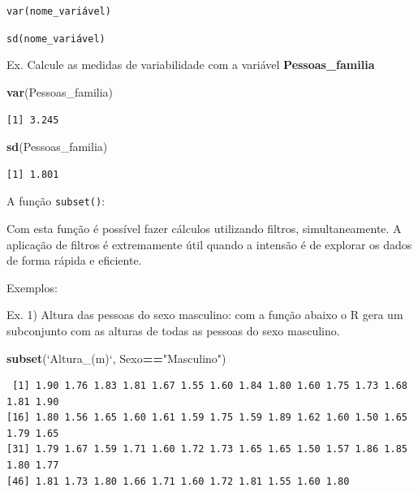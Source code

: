 \documentclass[12pt,brazil,oneside]{book}
\newenvironment{Shaded}{\begin{snugshade}}{\end{snugshade}}
\newcommand{\DataTypeTok}[1]{\textcolor[rgb]{0.13,0.29,0.53}{#1}}
\newcommand{\KeywordTok}[1]{\textcolor[rgb]{0.13,0.29,0.53}{\textbf{#1}}}
\newcommand{\NormalTok}[1]{#1}
\newcommand{\OperatorTok}[1]{\textcolor[rgb]{0.81,0.36,0.00}{\textbf{#1}}}
\newcommand{\StringTok}[1]{\textcolor[rgb]{0.31,0.60,0.02}{#1}}
\begin{document}
\texttt{var(nome\_variável)}

\texttt{sd(nome\_variável)}

Ex. Calcule as medidas de variabilidade com a variável \textbf{Pessoas\_familia}

\begin{Shaded}
\begin{Highlighting}[]
\KeywordTok{var}\NormalTok{(Pessoas_familia)}
\end{Highlighting}
\end{Shaded}

\begin{verbatim}
[1] 3.245
\end{verbatim}

\begin{Shaded}
\begin{Highlighting}[]
\KeywordTok{sd}\NormalTok{(Pessoas_familia)}
\end{Highlighting}
\end{Shaded}

\begin{verbatim}
[1] 1.801
\end{verbatim}

A função \texttt{subset()}:

Com esta função é possível fazer cálculos utilizando filtros, simultaneamente. A aplicação de filtros é extremamente útil quando a intensão é de explorar os dados de forma rápida e eficiente.

Exemplos:

Ex. 1) Altura das pessoas do sexo masculino: com a função abaixo o R gera um subconjunto com as alturas de todas as pessoas do sexo masculino.

\begin{Shaded}
\begin{Highlighting}[]
\KeywordTok{subset}\NormalTok{(}\StringTok{`}\DataTypeTok{Altura_(m)}\StringTok{`}\NormalTok{, Sexo}\OperatorTok{==}\StringTok{"Masculino"}\NormalTok{)}
\end{Highlighting}
\end{Shaded}

\begin{verbatim}
 [1] 1.90 1.76 1.83 1.81 1.67 1.55 1.60 1.84 1.80 1.60 1.75 1.73 1.68 1.81 1.90
[16] 1.80 1.56 1.65 1.60 1.61 1.59 1.75 1.59 1.89 1.62 1.60 1.50 1.65 1.79 1.65
[31] 1.79 1.67 1.59 1.71 1.60 1.72 1.73 1.65 1.65 1.50 1.57 1.86 1.85 1.80 1.77
[46] 1.81 1.73 1.80 1.66 1.71 1.60 1.72 1.81 1.55 1.60 1.80
\end{verbatim}
\end{document}
